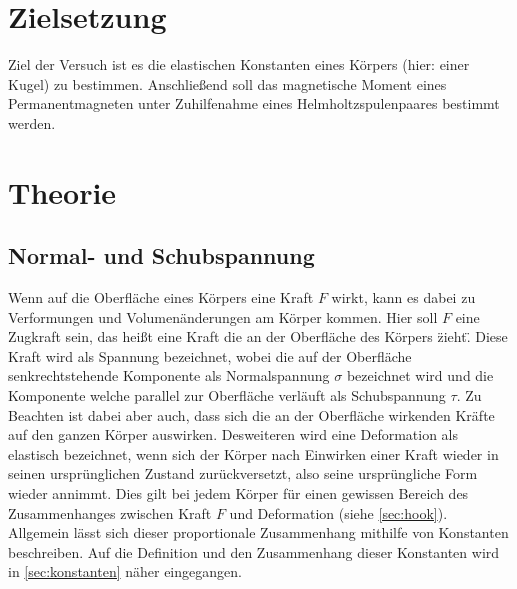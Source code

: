 \section{Zielsetzung}
Ziel der Versuch ist es die elastischen Konstanten eines Körpers (hier: einer Kugel) zu bestimmen. Anschließend soll das magnetische
Moment eines Permanentmagneten unter Zuhilfenahme eines Helmholtzspulenpaares bestimmt werden.
\section{Theorie}
\label{sec:Theorie}
    \subsection{Normal- und Schubspannung}
    Wenn auf die Oberfläche eines Körpers eine Kraft $F$ wirkt, kann es dabei zu Verformungen und Volumenänderungen am Körper
    kommen. Hier soll $F$ eine Zugkraft sein, das heißt eine Kraft die an der Oberfläche des Körpers \"zieht\". Diese Kraft wird
    als Spannung bezeichnet, wobei die auf der Oberfläche senkrechtstehende Komponente als Normalspannung $\sigma$ bezeichnet wird
    und die Komponente welche parallel zur Oberfläche verläuft als Schubspannung $\tau$.
    Zu Beachten ist dabei aber auch, dass sich die an der Oberfläche wirkenden Kräfte auf den ganzen Körper auswirken.
    Desweiteren wird eine Deformation als elastisch bezeichnet, wenn sich der Körper nach Einwirken einer Kraft wieder in seinen
    ursprünglichen Zustand zurückversetzt, also seine ursprüngliche Form wieder annimmt. Dies gilt bei jedem Körper für einen 
    gewissen Bereich des Zusammenhanges zwischen Kraft $F$ und Deformation (siehe \autoref{sec:hook}). Allgemein lässt sich dieser 
    proportionale Zusammenhang mithilfe von Konstanten beschreiben. Auf die Definition und den Zusammenhang dieser Konstanten wird 
    in \autoref{sec:konstanten} näher eingegangen.
